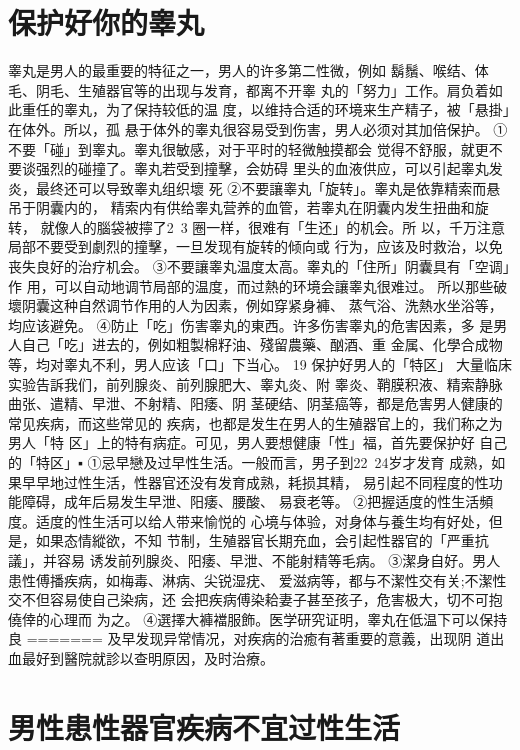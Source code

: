 \documentclass[12pt,UTF8]{ctexbook}
\begin{document}
\section{保护好你的睾丸}
睾丸是男人的最重要的特征之一，男人的许多第二性微，例如
鬍鬚、喉结、体毛、阴毛、生殖器官等的出现与发育，都离不开睾
丸的「努力」工作。肩负着如此重任的睾丸，为了保持较低的温
度，以维持合适的环境来生产精子，被「悬掛」在体外。所以，孤
悬于体外的睾丸很容易受到伤害，男人必须对其加倍保护。
①不要「碰」到睾丸。睾丸很敏感，对于平时的轻微触摸都会
觉得不舒服，就更不要谈强烈的碰撞了。睾丸若受到撞擊，会妨碍
里头的血液供应，可以引起睾丸发炎，最终还可以导致睾丸组织壞
死
②不要讓睾丸「旋转」。睾丸是依靠精索而悬吊于阴囊内的，
精索内有供给睾丸营养的血管，若睾丸在阴囊内发生扭曲和旋转，
就像人的腦袋被擰了2~3 圈一样，很难有「生还」的机会。所
以，千万注意局部不要受到劇烈的撞擊，一旦发现有旋转的倾向或
行为，应该及时救治，以免丧失良好的治疗机会。
③不要讓睾丸温度太高。睾丸的「住所」阴囊具有「空调」作
用，可以自动地调节局部的温度，而过熱的环境会讓睾丸很难过。
所以那些破壞阴囊这种自然调节作用的人为因素，例如穿紧身褲、
蒸气浴、洗熱水坐浴等，均应该避免。
④防止「吃」伤害睾丸的東西。许多伤害睾丸的危害因素，多
是男人自己「吃」进去的，例如粗製棉籽油、殘留農藥、酗酒、重
金属、化學合成物等，均对睾丸不利，男人应该「口」下当心。
19 保护好男人的「特区」
大量临床实验告訴我们，前列腺炎、前列腺肥大、睾丸炎、附
睾炎、鞘膜积液、精索静脉曲张、遣精、早泄、不射精、阳痿、阴
茎硬结、阴茎癌等，都是危害男人健康的常见疾病，而这些常见的
疾病，也都是发生在男人的生殖器官上的，我们称之为男人「特
区」上的特有病症。可见，男人要想健康「性」福，首先要保护好
自己的「特区」▪
①忌早戀及过早性生活。一般而言，男子到22~24岁才发育
成熟，如果早早地过性生活，性器官还没有发育成熟，耗损其精，
易引起不同程度的性功能障碍，成年后易发生早泄、阳痿、腰酸、
易衰老等。
②把握适度的性生活頻度。适度的性生活可以给人带来愉悦的
心境与体验，对身体与養生均有好处，但是，如果态情縱欲，不知
节制，生殖器官长期充血，会引起性器官的「严重抗議」，并容易
诱发前列腺炎、阳痿、早泄、不能射精等毛病。
③潔身自好。男人患性傅播疾病，如梅毒、淋病、尖锐湿疣、
爱滋病等，都与不潔性交有关;不潔性交不但容易使自己染病，还
会把疾病傅染耠妻子甚至孩子，危害极大，切不可抱僥倖的心理而
为之。
④選擇大褲襠服飾。医学研究证明，睾丸在低温下可以保持良
=======
及早发现异常情况，对疾病的治癒有著重要的意義，出现阴
道出血最好到醫院就診以查明原因，及时治療。

\section{男性患性器官疾病不宜过性生活}
\end{document}
